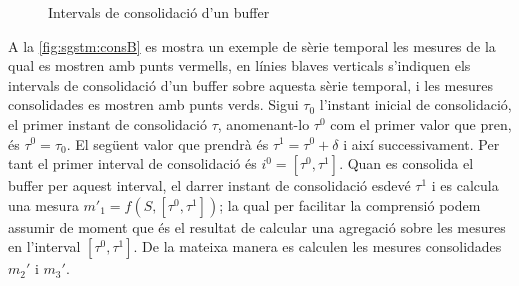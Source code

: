 \begin{figure}[tp]
  \centering

  \caption{Intervals de consolidació d'un buffer}
  \label{fig:sgstm:consB}
\end{figure}




A la \autoref{fig:sgstm:consB} es mostra un exemple de sèrie temporal
les mesures de la qual es mostren amb punts vermells, en línies blaves
verticals s'indiquen els intervals de consolidació d'un buffer sobre
aquesta sèrie temporal, i les mesures consolidades es mostren amb
punts verds.  Sigui $\tau_0$ l'instant inicial de consolidació, el
primer instant de consolidació $\tau$, anomenant-lo $\tau^0$ com el
primer valor que pren, és $\tau^0=\tau_0$. El següent valor que
prendrà és $\tau^1=\tau^0+\delta$ i així successivament.  Per tant el
primer interval de consolidació és $i^0=[\tau^0,\tau^1]$. Quan es
consolida el buffer per aquest interval, el darrer instant de
consolidació esdevé $\tau^1$ i es calcula una mesura
$m'_1=f(S,[\tau^0,\tau^1])$; la qual per facilitar la comprensió podem
assumir de moment que és el resultat de calcular una agregació sobre
les mesures en l'interval $[\tau^0,\tau^1]$. De la mateixa manera es
calculen les mesures consolidades $m_2'$ i $m_3'$.




